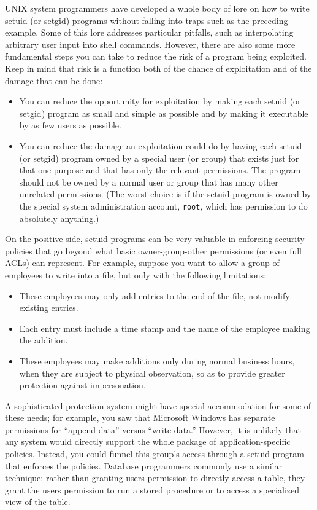 UNIX system programmers have developed a whole body of lore on how to
write setuid (or setgid) programs without falling into traps such as
the preceding example.  Some of this lore addresses particular pitfalls,
such as interpolating arbitrary user input into shell commands.
However, there are also some more fundamental steps you can take to
reduce the risk of a program being exploited.  Keep in mind that risk
is a function both of the chance of exploitation and of the damage
that can be done:
\begin{itemize}
\item
You can reduce the opportunity for exploitation by making each setuid
(or setgid) program as small and simple as possible and by making it
executable by as few users as possible.
\item
You can reduce the damage an exploitation could do by having each
setuid (or setgid) program owned by a special user (or group) that
exists just for that one purpose and that has only the relevant
permissions.  The program should not be owned by a normal user or group that has many other
unrelated permissions.  (The worst choice is if the setuid program is
owned by the special system administration account, {\tt root}, which
has permission to do absolutely anything.)
\end{itemize}

On the positive side, setuid programs can be very valuable in
enforcing security policies that go beyond what basic
owner-group-other permissions (or even full ACLs) can represent.  For
example, suppose you want to allow a group of employees to write into
a file, but only with the following limitations:
\begin{itemize}
\item
These employees may only add entries to the end of the file, not
modify existing entries.
\item
Each entry must include a time stamp and the name of the employee
making the addition.
\item
These employees may make additions only during normal business hours,
when they are subject to physical observation, so as to provide
greater protection against impersonation.
\end{itemize}
A sophisticated protection system might have special accommodation for
some of these needs; for example, you saw that Microsoft Windows has
separate permissions for ``append data'' versus ``write data.''
However, it is unlikely that any system would directly support the
whole package of application-specific policies.  Instead, you could
funnel this group's access through a setuid program that enforces the
policies.  Database programmers commonly use a similar technique:
rather than granting users permission to directly access a table, they
grant the users permission to run a stored procedure or to access a
specialized view of the table.

